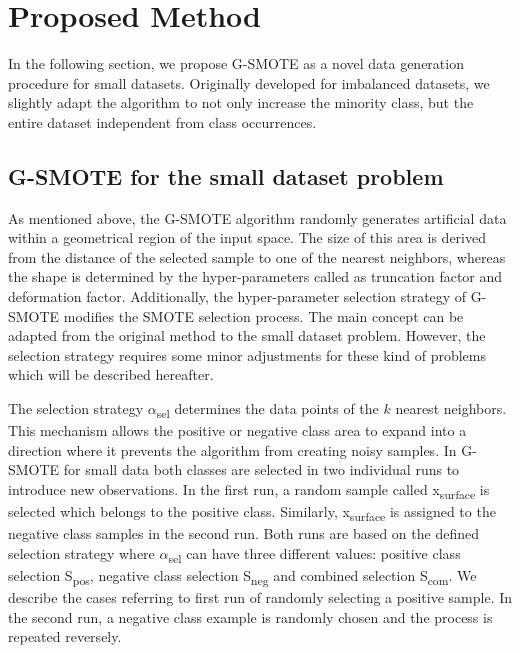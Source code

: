 \documentclass[parskip=full]{scrartcl}
\begin{document}
\section{Proposed Method}

In the following section, we propose G-SMOTE as a novel data generation procedure 
for small datasets. Originally developed for imbalanced datasets, we 
slightly adapt the algorithm to not only increase the minority class, but the 
entire dataset independent from class occurrences. 

\subsection{G-SMOTE for the small dataset problem}

As mentioned above, the G-SMOTE algorithm randomly generates artificial data
within a geometrical region of the input space. The size of this area is derived
from the distance of the selected sample to one of the nearest neighbors,
whereas the shape is determined by the hyper-parameters called as truncation
factor and deformation factor. Additionally, the hyper-parameter selection
strategy of G-SMOTE modifies the SMOTE selection process. The main concept can
be adapted from the original method to the small dataset problem. However, the
selection strategy requires some minor adjustments for these kind of problems
which will be described hereafter.

The selection strategy $\alpha$\textsubscript{sel} determines the data points 
of the $\mathit{k}$ nearest neighbors. This mechanism allows the positive or 
negative class area to expand into a direction where it prevents the algorithm 
from creating noisy samples. In G-SMOTE for small data both classes are 
selected in two individual runs to introduce new observations. In the first 
run, a random sample called x\textsubscript{surface} is selected which belongs 
to the positive class. Similarly, x\textsubscript{surface} is assigned to the 
negative class samples in the second run. Both runs are based on the defined 
selection strategy where $\alpha$\textsubscript{sel} can have three different 
values: positive class selection S\textsubscript{pos}, negative class selection 
S\textsubscript{neg} and combined selection S\textsubscript{com}. We describe 
the cases referring to first run of randomly selecting a positive sample. In 
the second run, a negative class example is randomly chosen and the process is 
repeated reversely. 
\end{document}
